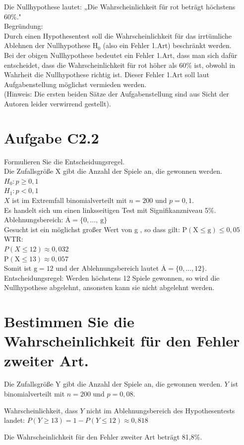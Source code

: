 \documentclass[10pt]{article}
\begin{document}
Die Nullhypothese lautet: „Die Wahrscheinlichkeit für rot beträgt höchstens 60\%."\\
Begründung:\\
Durch einen Hypothesentest soll die Wahrscheinlichkeit für das irrtümliche Ablehnen der Nullhypothese $\mathrm{H}_{0}$ (also ein Fehler 1.Art) beschränkt werden.\\
Bei der obigen Nullhypothese bedeutet ein Fehler 1.Art, dass man sich dafür entscheidet, dass die Wahrscheinlichkeit für rot höher als 60\% ist, obwohl in Wahrheit die Nullhypothese richtig ist. Dieser Fehler 1.Art soll laut Aufgabenstellung möglichst vermieden werden.\\
(Hinweis: Die ersten beiden Sätze der Aufgabenstellung sind aus Sicht der Autoren leider verwirrend gestellt).

\section*{Aufgabe C2.2}
Formulieren Sie die Entscheidungsregel.\\
Die Zufallsgröße X gibt die Anzahl der Spiele an, die gewonnen werden.\\
$H_{0}: p \geq 0,1$\\
$H_{1}: p<0,1$\\
$X$ ist im Extremfall binomialverteilt mit $n=200$ und $p=0,1$.\\
Es handelt sich um einen linksseitigen Test mit Signifikanzniveau 5\%.\\
Ablehnungsbereich: $\overline{\mathrm{A}}=\{0, \ldots, \mathrm{~g}\}$\\
Gesucht ist ein möglichst großer Wert von g , so dass gilt: $\mathrm{P}(\mathrm{X} \leq \mathrm{g}) \leq 0,05$\\
WTR:\\
$P(X \leq 12) \approx 0,032$\\
$\mathrm{P}(\mathrm{X} \leq 13) \approx 0,057$\\
Somit ist $\mathrm{g}=12$ und der Ablehnungsbereich lautet $\overline{\mathrm{A}}=\{0, \ldots, 12\}$.\\
Entscheidungsregel: Werden höchstens 12 Spiele gewonnen, so wird die Nullhypothese abgelehnt, ansonsten kann sie nicht abgelehnt werden.

\section*{Bestimmen Sie die Wahrscheinlichkeit für den Fehler zweiter Art.}
Die Zufallsgröße Y gibt die Anzahl der Spiele an, die gewonnen werden. $Y$ ist binomialverteilt mit $n=200$ und $p=0,08$.

Wahrscheinlichkeit, dass $Y$ nicht im Ablehnungsbereich des Hypothesentests landet: $P(Y \geq 13)=1-P(Y \leq 12) \approx 0,818$

Die Wahrscheinlichkeit für den Fehler zweiter Art beträgt 81,8\%.
\end{document}
